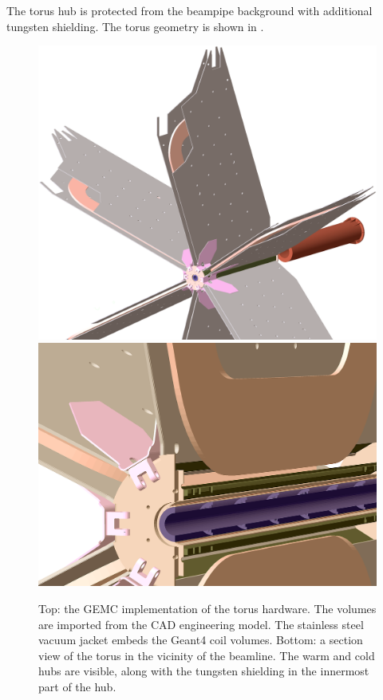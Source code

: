 The torus hub is protected from the beampipe background with additional tungsten shielding.
The torus geometry is shown in .

\begin{figure}
	\centering
	\includegraphics[width=0.99\columnwidth,keepaspectratio]{img/torusGeometry.png}
	\includegraphics[width=0.99\columnwidth,keepaspectratio]{img/torusDetail.png}
	\caption{Top: the GEMC implementation of the torus hardware. The volumes are imported from the CAD engineering model.
             The stainless steel vacuum jacket embeds the Geant4 coil volumes.
			 Bottom: a section view of the torus in the vicinity of the beamline. The warm and cold hubs are visible, along with the
			 tungsten shielding in the innermost part of the hub.}
	\label{fig:torus}
\end{figure}


